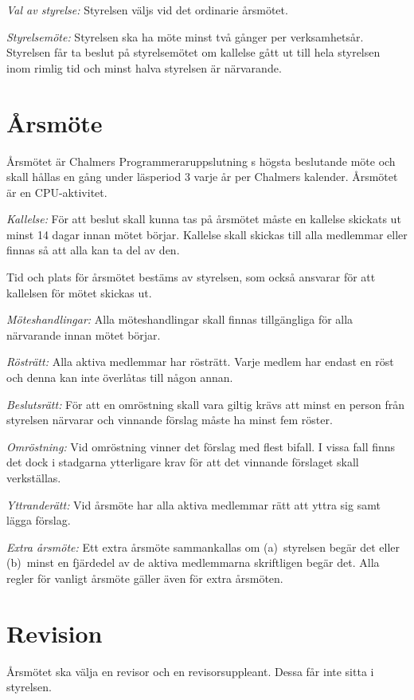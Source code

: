 \documentclass[a4paper]{article}
\makeatletter
\newif\iffullCPU
\def\CPU{%
	\iffullCPU%
		\fullCPUfalse%
		Chalmers Programmeraruppslutning\xspace%
	\else%
		CPU\xspace%
	\fi%
}
\newcommand\countparagraphs{%
	\everypar{%
		\@nobreakfalse%
		\addtocounter{paragraph}{1}%
		\hspace{-4em}%
		\makebox[3em][r]{\small\theparagraph}%
		\hspace{1em}%
		\fullCPUtrue
	}%
}
\renewcommand\theparagraph{\textparagraph\,\arabic{paragraph}}
\let\oldsection\section
\renewcommand\section[1]{%
	\everypar{}%
	\oldsection{#1}\vspace{-1em}%
	\countparagraphs%
	\fullCPUtrue%
}
\makeatother
\begin{document}
\emph{Val av styrelse:} Styrelsen väljs vid det ordinarie årsmötet.

\emph{Styrelsemöte:} Styrelsen ska ha möte minst två gånger per verksamhetsår. Styrelsen får ta beslut på styrelsemötet om kallelse gått ut till hela styrelsen inom rimlig tid och minst halva styrelsen är närvarande.

\section{Årsmöte}

Årsmötet är \CPU{s} högsta beslutande möte och skall hållas en gång under läsperiod 3 varje år per Chalmers kalender. Årsmötet är en CPU-aktivitet.

\emph{Kallelse:} För att beslut skall kunna tas på årsmötet måste en kallelse skickats ut minst 14 dagar innan mötet börjar. Kallelse skall skickas till alla medlemmar eller finnas så att alla kan ta del av den.

Tid och plats för årsmötet bestäms av styrelsen, som också ansvarar för att kallelsen för mötet skickas ut.

\emph{Möteshandlingar:} Alla möteshandlingar skall finnas tillgängliga för alla närvarande innan mötet börjar.

\emph{Rösträtt:} Alla aktiva medlemmar har rösträtt. Varje medlem har endast en röst och denna kan inte överlåtas till någon annan.

\emph{Beslutsrätt:} För att en omröstning skall vara giltig krävs att minst en person från styrelsen närvarar och vinnande förslag måste ha minst fem röster.

\emph{Omröstning:} Vid omröstning vinner det förslag med flest bifall. I vissa fall finns det dock i stadgarna ytterligare krav för att det vinnande förslaget skall verkställas.

\emph{Yttranderätt:} Vid årsmöte har alla aktiva medlemmar rätt att yttra sig samt lägga förslag.

\emph{Extra årsmöte:} Ett extra årsmöte sammankallas om (a)~styrelsen begär det eller (b)~minst en fjärdedel av de aktiva medlemmarna skriftligen begär det. Alla regler för vanligt årsmöte gäller även för extra årsmöten.

\section{Revision}

Årsmötet ska välja en revisor och en revisorsuppleant. Dessa får inte sitta i styrelsen.
\end{document}
